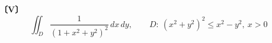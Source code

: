 \noindent\textbf{〔V〕}
\[
\iint_D \frac{1}{(1+x^2+y^2)^2}\,dx\,dy,\qquad
D:\ (x^2+y^2)^2\le x^2-y^2,\ x>0
\]
